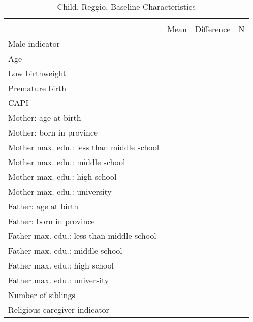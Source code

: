\begin{table}[htbp]\centering
\def\sym#1{\ifmmode^{#1}\else\(^{#1}\)\fi}
\caption{Child, Reggio, Baseline Characteristics}
\begin{tabular}{l*{1}{ccc}}
\toprule
                    &\multicolumn{3}{c}{}                           \\
                    &        Mean         &  Difference&           N\\
\midrule
Male indicator      &                     &            &            \\
Age                 &                     &            &            \\
Low birthweight     &                     &            &            \\
Premature birth     &                     &            &            \\
CAPI                &                     &            &            \\
Mother: age at birth&                     &            &            \\
Mother: born in province&                     &            &            \\
Mother max. edu.: less than middle school&                     &            &            \\
Mother max. edu.: middle school&                     &            &            \\
Mother max. edu.: high school&                     &            &            \\
Mother max. edu.: university&                     &            &            \\
Father: age at birth&                     &            &            \\
Father: born in province&                     &            &            \\
Father max. edu.: less than middle school&                     &            &            \\
Father max. edu.: middle school&                     &            &            \\
Father max. edu.: high school&                     &            &            \\
Father max. edu.: university&                     &            &            \\
Number of siblings  &                     &            &            \\
Religious caregiver indicator&                     &            &            \\

\end{tabular}
\end{table}
